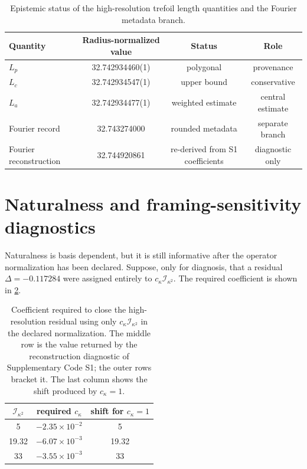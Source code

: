 \documentclass[aps,pre,preprint,notitlepage,nofootinbib,superscriptaddress]{revtex4-2}
\newcommand{\calI}{\mathcal I}
\begin{document}
\begin{table}[t]
\caption{Epistemic status of the high-resolution trefoil length quantities and the Fourier metadata branch.}
\label{tab:provenance-v020}
\begin{ruledtabular}
\scriptsize
\begin{tabular}{@{}lccc@{}}
Quantity & Radius-normalized value & Status & Role\\
\hline
$L_p$ & 32.742934460(1) & polygonal & provenance\\
$L_c$ & 32.742934547(1) & upper bound & conservative\\
$L_a$ & 32.742934477(1) & weighted estimate & central estimate\\
Fourier record & 32.743274000 & rounded metadata & separate branch\\
Fourier reconstruction & 32.744920861 & re-derived from S1 coefficients & diagnostic only\\
\end{tabular}
\end{ruledtabular}
\end{table}

\section{Naturalness and framing-sensitivity diagnostics}
\label{sec:naturalness}

Naturalness is basis dependent, but it is still informative after the operator normalization has been declared.  Suppose, only for diagnosis, that a residual $\Delta=-0.117284$ were assigned entirely to $c_\kappa\calI_{\kappa^2}$.  The required coefficient is shown in \cref{tab:naturalness-curvature}.

\begin{table}[t]
\caption{Coefficient required to close the high-resolution residual using only $c_\kappa\calI_{\kappa^2}$ in the declared normalization.  The middle row is the value returned by the reconstruction diagnostic of Supplementary Code S1; the outer rows bracket it.  The last column shows the shift produced by $c_\kappa=1$.}
\label{tab:naturalness-curvature}
\begin{ruledtabular}
\begin{tabular}{ccc}
$\calI_{\kappa^2}$ & required $c_\kappa$ & shift for $c_\kappa=1$\\
\hline
5     & $-2.35\times10^{-2}$ & 5\\
19.32 & $-6.07\times10^{-3}$ & 19.32\\
33    & $-3.55\times10^{-3}$ & 33\\
\end{tabular}
\end{ruledtabular}
\end{table}
\end{document}
